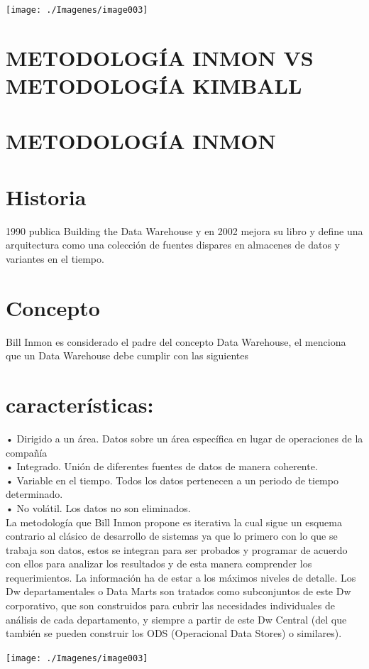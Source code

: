 \begin{center}
\texttt{[image: ./Imagenes/image003]}
\end{center}


\newpage


\section{METODOLOGÍA INMON VS METODOLOGÍA KIMBALL}


\section{METODOLOGÍA INMON}
\section{Historia}
1990 publica Building the Data Warehouse y en 2002 mejora su libro y define una arquitectura como una colección de fuentes dispares en almacenes de datos y variantes en el tiempo.
\section{Concepto}
Bill Inmon es considerado el padre del concepto Data Warehouse, el menciona que un Data Warehouse debe cumplir con las siguientes \section{características:}
•	Dirigido a un área. Datos sobre un área específica en lugar de operaciones de la compañía\\
•	Integrado. Unión de diferentes fuentes de datos de manera coherente.\\
•	Variable en el tiempo. Todos los datos pertenecen a un periodo de tiempo determinado.\\
•	No volátil. Los datos no son eliminados.\\
La metodología que Bill Inmon propone es iterativa la cual sigue un esquema contrario al clásico de desarrollo de sistemas ya que lo primero con lo que se trabaja son datos, estos se integran para ser probados y programar de acuerdo con ellos para analizar los resultados y de esta manera comprender los requerimientos. 
La información ha de estar a los máximos niveles de detalle. Los Dw departamentales o Data Marts son tratados como subconjuntos de este Dw corporativo, que son construidos para cubrir las necesidades individuales de análisis de cada departamento, y siempre a partir de este Dw Central (del que también se pueden construir los ODS (Operacional Data Stores) o similares).\\
\begin{center}
\texttt{[image: ./Imagenes/image003]}
\end{center}
 

